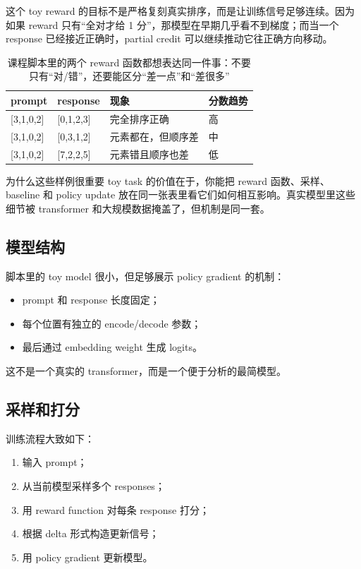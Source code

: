 这个 toy reward 的目标不是严格复刻真实排序，而是让训练信号足够连续。因为如果 reward 只有“全对才给 1 分”，那模型在早期几乎看不到梯度；而当一个 response 已经接近正确时，partial credit 可以继续推动它往正确方向移动。

\begin{table}[H]
\centering
\begin{tabular}{@{}p{3.4cm}p{4.8cm}p{3.6cm}p{2.2cm}@{}}
\toprule
\textbf{prompt} & \textbf{response} & \textbf{现象} & \textbf{分数趋势} \\
\midrule
{[}3,1,0,2{]} & {[}0,1,2,3{]} & 完全排序正确 & 高 \\
{[}3,1,0,2{]} & {[}0,3,1,2{]} & 元素都在，但顺序差 & 中 \\
{[}3,1,0,2{]} & {[}7,2,2,5{]} & 元素错且顺序也差 & 低 \\
\bottomrule
\end{tabular}
\caption{课程脚本里的两个 reward 函数都想表达同一件事：不要只有“对/错”，还要能区分“差一点”和“差很多”}
\end{table}

\begin{importantbox}{为什么这些样例很重要}
toy task 的价值在于，你能把 reward 函数、采样、baseline 和 policy update 放在同一张表里看它们如何相互影响。真实模型里这些细节被 transformer 和大规模数据掩盖了，但机制是同一套。
\end{importantbox}

\subsection{模型结构}

脚本里的 toy model 很小，但足够展示 policy gradient 的机制：
\begin{itemize}
    \item prompt 和 response 长度固定；
    \item 每个位置有独立的 encode/decode 参数；
\item 最后通过 embedding weight 生成 logits。
\end{itemize}

这不是一个真实的 transformer，而是一个便于分析的最简模型。


\subsection{采样和打分}

训练流程大致如下：
\begin{enumerate}
    \item 输入 prompt；
    \item 从当前模型采样多个 responses；
    \item 用 reward function 对每条 response 打分；
    \item 根据 delta 形式构造更新信号；
    \item 用 policy gradient 更新模型。
\end{enumerate}

